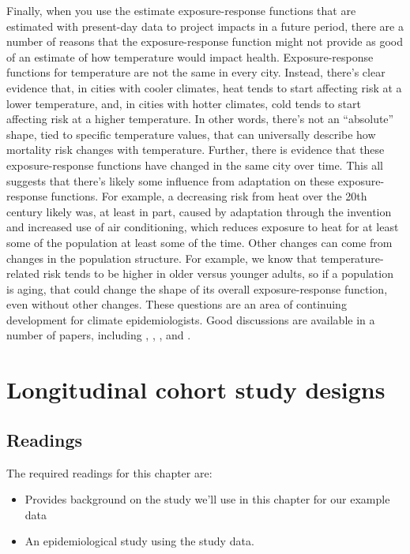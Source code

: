 \documentclass[
]{book}
\begin{document}
Finally, when you use the estimate exposure-response functions that are estimated with present-day data to project impacts in a future period, there are a number of reasons that the exposure-response function might not provide as good of an estimate of how temperature would impact health. Exposure-response functions for temperature are not the same in every city. Instead, there's clear evidence that, in cities with cooler climates, heat tends to start affecting risk at a lower temperature, and, in cities with hotter climates, cold tends to start affecting risk at a higher temperature. In other words, there's not an ``absolute'' shape, tied to specific temperature values, that can universally describe how mortality risk changes with temperature. Further, there is evidence that these exposure-response functions have changed in the same city over time. This all suggests that there's likely some influence from adaptation on these exposure-response functions. For example, a decreasing risk from heat over the 20th century likely was, at least in part, caused by adaptation through the invention and increased use of air conditioning, which reduces exposure to heat for at least some of the population at least some of the time. Other changes can come from changes in the population structure. For example, we know that temperature-related risk tends to be higher in older versus younger adults, so if a population is aging, that could change the shape of its overall exposure-response function, even without other changes. These questions are an area of continuing development for climate epidemiologists. Good discussions are available in a number of papers, including \citet{kinney2008approaches}, \citet{arbuthnott2016changes}, \citet{gosling2017adaptation}, and \citet{kinney2018temporal}.

\chapter{Longitudinal cohort study designs}\label{longitudinal-cohort-study-designs}

\section{Readings}\label{readings-4}

The required readings for this chapter are:

\begin{itemize}
\item
  \citet{andersson201970} Provides background on the study we'll use in this chapter for our example data
\item
  \citet{wong1989risk} An epidemiological study using the study data.
\end{itemize}
\end{document}
